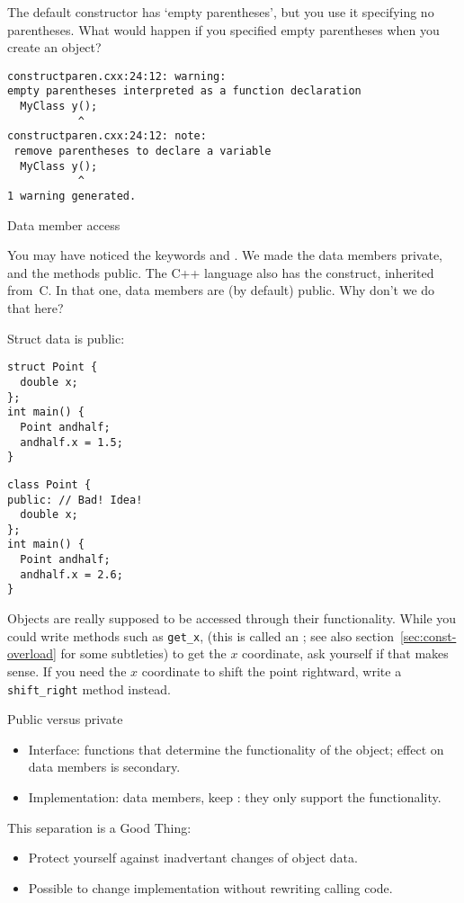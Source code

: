 \begin{remark}
  The default constructor has `empty parentheses', but you use
  it specifying no parentheses.
  What would happen if you specified empty parentheses when you create an object?
  

\begin{verbatim}
constructparen.cxx:24:12: warning: 
empty parentheses interpreted as a function declaration
  MyClass y();
           ^
constructparen.cxx:24:12: note:
 remove parentheses to declare a variable
  MyClass y();
           ^
1 warning generated.  
\end{verbatim}
\end{remark}

 {Data member access}

You may have noticed the keywords  and
. We made the data members private, and the
methods public.
The C++ language also has the  construct,
inherited from~C.
In that one, data members are (by default) public. Why don't we do that here?

\begin{multicols}{2}
Struct data is public:
\begin{lstlisting}
struct Point {
  double x;
};
int main() {
  Point andhalf;
  andhalf.x = 1.5;
}
\end{lstlisting}

\columnbreak

\begin{lstlisting}
class Point {
public: // Bad! Idea!
  double x;
};
int main() {
  Point andhalf;
  andhalf.x = 2.6;
}
\end{lstlisting}
\end{multicols}

Objects are really supposed to be accessed through their functionality.
While you could write methods such as \lstinline+get_x+,
(this is called an ;
see also section~\ref{sec:const-overload} for some subtleties)
to get the $x$ coordinate,
ask yourself if that makes sense.
If you need the $x$ coordinate to shift the point rightward,
write a \lstinline+shift_right+ method instead.

\begin{block}{Public versus private}
  \label{sl:interfaceimpl}
  \begin{itemize}
  \item Interface:  functions that determine the
    functionality of the object; effect on data members is secondary.
  \item Implementation: data members, keep : they
    only support the functionality.
  \end{itemize}
  This separation is a Good Thing:
  \begin{itemize}
  \item Protect yourself against inadvertant changes of object data.
  \item Possible to change implementation without rewriting calling code.
  \end{itemize}
\end{block}

